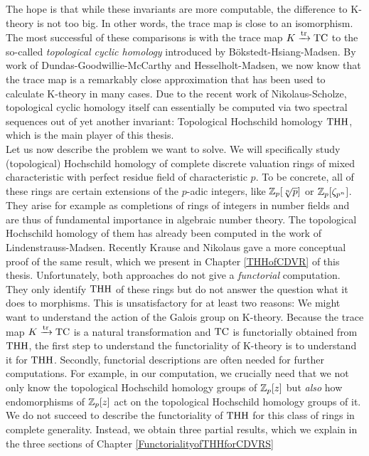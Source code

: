 The hope is that while these invariants are more computable, the difference to K-theory is not too big. In other words, the trace map is close to an isomorphism. 
The most successful of these comparisons is with the trace map $K\xrightarrow{\operatorname{tr}} \operatorname{TC}$ to the so-called \textit{topological cyclic homology} introduced by Bökstedt-Hsiang-Madsen.
By work of Dundas-Goodwillie-McCarthy and Hesselholt-Madsen, we now know that the trace map is a remarkably close approximation that has been used to calculate K-theory in many cases.
Due to the recent work of Nikolaus-Scholze, topological cyclic homology itself can essentially be computed via two spectral sequences out of yet another invariant: Topological Hochschild homology $\operatorname{THH}$, which is the main player of this thesis. \\
Let us now describe the problem we want to solve.
We will specifically study (topological) Hochschild homology of complete discrete valuation rings of mixed characteristic with perfect residue field of characteristic $p$. 
To be concrete, all of these rings are certain extensions of the $p$-adic integers, like $\mathbb{Z}_p[\sqrt[n]{p}]$ or $\mathbb{Z}_p[\zeta_{p^n}]$. They arise for example as completions of rings of integers in number fields and are thus of fundamental importance in algebraic number theory.
The topological Hochschild homology of them has already been computed in the work of Lindenstrauss-Madsen. 
Recently Krause and Nikolaus gave a more conceptual proof of the same result, which we present in Chapter \ref{THHofCDVR} of this thesis. 
Unfortunately, both approaches do not give a \textit{functorial} computation. They only identify $\operatorname{THH}$ of these rings but do not answer the question what it does to morphisms. 
This is unsatisfactory for at least two reasons: We might want to understand the action of the Galois group on K-theory. Because the trace map $K\xrightarrow{\operatorname{tr}}\operatorname{TC}$ is a natural transformation and $\operatorname{TC}$ is functorially obtained from $\operatorname{THH}$, the first step to understand the functoriality of K-theory is to understand it for $\operatorname{THH}$.
Secondly, functorial descriptions are often needed for further computations. For example, in our computation, we crucially need that we not only know the topological Hochschild homology groups of $\mathbb{Z}_p[z]$ but \textit{also} how endomorphisms of $\mathbb{Z}_p[z]$ act on the topological Hochschild homology groups of it. \\
We do not succeed to describe the functoriality of $\operatorname{THH}$ for this class of rings in complete generality. Instead, we obtain three partial results, which we explain in the three sections of Chapter \ref{FunctorialityofTHHforCDVRS}\\

